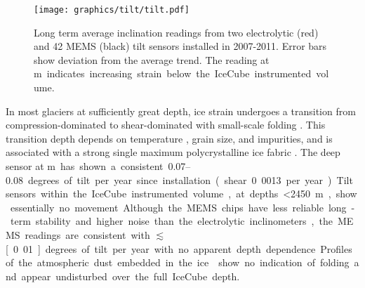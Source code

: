 \begin{figure}[!h]
 \centering
\texttt{[image: graphics/tilt/tilt.pdf]}
\caption{Long term average inclination readings from two electrolytic (red) and 42 MEMS (black) tilt sensors installed in 2007-2011.  Error bars show deviation from the average trend.  The reading at \unit[2540]m indicates increasing strain below the IceCube instrumented volume.}
\label{fig:tilt}
\end{figure}


In most glaciers at sufficiently great depth, ice strain undergoes a transition from compression-dominated to shear-dominated with small-scale folding \cite{montagnat14,jansen16}.  This transition depth depends on temperature \cite{price2002temperature}, grain size, and impurities, and is associated with a strong single maximum polycrystalline ice fabric \cite{cuffey10}.  The deep sensor at \unit[2540]m has shown a consistent \numrange[range-phrase = --]{0.07}{0.08} degrees of tilt per year since installation (shear 0.0013 per year).  Tilt sensors within the IceCube instrumented volume, at depths \SI{<2450}m,  show essentially no movement.  Although the MEMS chips have less reliable long-term stability and higher noise than the electrolytic inclinometers, the MEMS readings are consistent with $\lesssim$\unit[0.01]degrees of tilt per year with no apparent depth dependence.  Profiles of the atmospheric dust embedded in the ice \cite{I3:dustlogger} show no indication of folding and appear undisturbed over the full IceCube depth.
  
